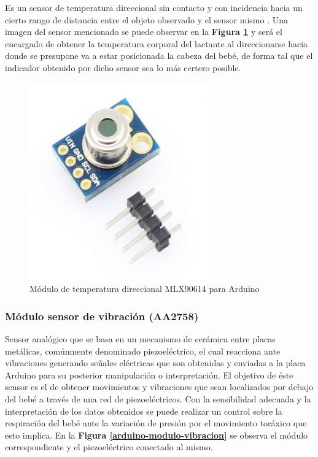 \documentclass{IEEEtran}
\begin{document}
				Es un sensor de temperatura direccional sin contacto y con incidencia hacia un cierto rango de distancia entre el objeto observado y el sensor mismo \cite{temperaturatecnico}. Una imagen del sensor mencionado se puede observar en la \textbf{Figura \ref{arduino-modulo-temperatura}} y será el encargado de obtener la temperatura corporal del lactante al direccionarse hacia donde se presupone va a estar posicionada la cabeza del bebé, de forma tal que el indicador obtenido por dicho sensor sea lo más certero posible.

				\begin{figure}
					\centering
					\includegraphics[width=0.5\linewidth]{arduino-modulo-temperatura}
					\caption{Módulo de temperatura direccional MLX90614 para Arduino}
					\label{arduino-modulo-temperatura}
				\end{figure}

			\subsubsection{Módulo sensor de vibración (\textbf{AA2758})}
			
				Sensor analógico que se basa en un mecanismo de cerámica entre placas metálicas, comúnmente denominado piezoeléctrico, el cual reacciona ante vibraciones generando señales eléctricas que son obtenidas y enviadas a la placa Arduino para su posterior manipulación o interpretación. El objetivo de éste sensor es el de obtener movimientos y vibraciones que sean localizados por debajo del bebé a través de una red de piezoeléctricos. Con la sensibilidad adecuada y la interpretación de los datos obtenidos se puede realizar un control sobre la respiración del bebé ante la variación de presión por el movimiento toráxico que esto implica. En la \textbf{Figura \ref{arduino-modulo-vibracion}} se observa el módulo correspondiente y el piezoeléctrico conectado al mismo.
\end{document}
